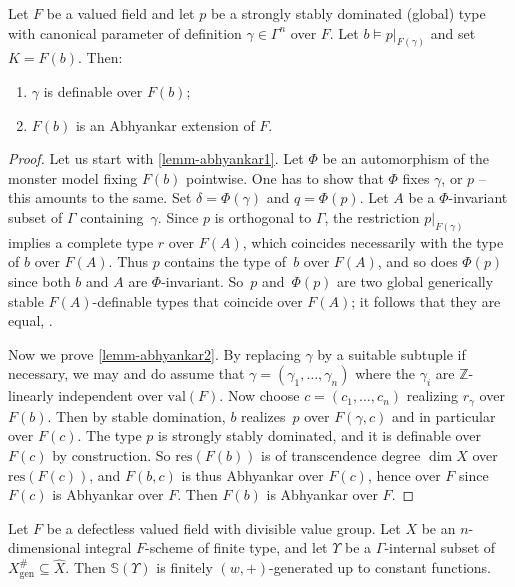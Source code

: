 \documentclass[JEP,XML,SOM,Unicode,ThmDefs,NoEqCountersInSection,published]{cedram}
\newcommand{\val}{\mathrm{val}}
\newcommand{\Z}{\mathbb Z}
\renewcommand{\SS}{\mathbb S}
\theoremstyle{plain}
\theoremstyle{definition}
\begin{document}
\begin{lemm}\label{lemm-abhyankar}
Let $F$ be a valued field and let $p$ be a strongly stably dominated (global) type with canonical parameter
of definition $\gamma\in \Gamma^n$ over $F$. Let $b\models p|_{F(\gamma)}$ and set $K=F(b)$. Then:
\begin{enumerate}
\item\label{lemm-abhyankar1} $\gamma$ is definable over $F(b)$;
\item\label{lemm-abhyankar2} $F(b)$ is an Abhyankar extension of $F$.
\end{enumerate}
\end{lemm}
\begin{proof}
Let us start with \eqref{lemm-abhyankar1}. Let $\Phi$ be an automorphism of the monster model fixing $F(b)$ pointwise. One has to show that $\Phi$ fixes $\gamma$, or $p$ --
this amounts to the same. Set $\delta=\Phi(\gamma)$ and $q=\Phi(p)$. Let $A$ be a $\Phi$-invariant subset of $\Gamma$ containing~$\gamma$.
Since $p$ is orthogonal to $\Gamma$,
the restriction $p|_{F(\gamma)}$ implies a complete type $r$ over $F(A)$, which coincides necessarily with the type of $b$ over $F(A)$. Thus $p$ contains the type of~$b$ over $F(A)$, and so does $\Phi(p)$ since both $b$ and $A$ are $\Phi$-invariant. So~$p$ and~$\Phi(p)$ are two global generically stable $F(A)$-definable types that coincide over $F(A)$; it follows that they are equal, \cf \cite[Prop.\,2.35]{simon}.

Now we prove \eqref{lemm-abhyankar2}. By replacing $\gamma$ by a suitable subtuple if necessary, we may and do assume that
$\gamma=(\gamma_1,\ldots, \gamma_n)$ where the $\gamma_i$ are $\Z$-linearly independent over $\val (F)$.
Now choose $c=(c_1,\ldots, c_n)$ realizing $r_\gamma$ over $F(b)$. Then by stable domination, $b$ realizes~$p$ over $F(\gamma, c)$
and in particular over $F(c)$. The type $p$ is strongly stably dominated, and it is definable over $F(c)$ by construction. So $\mathrm{res}(F(b))$
is of transcendence degree $\dim X$
over $\mathrm{res}(F(c))$, and $F(b,c)$ is thus Abhyankar over $F(c)$, hence over
$F$ since $F(c)$ is Abhyankar over $F$. Then $F(b)$ is Abhyankar over $F$.
\end{proof}

\begin{theo}\label{theo-tfinite-pure}Let $F$ be a defectless valued field with divisible value group. Let
$X$ be an $n$\nobreakdash-dimen\-sional integral $F$-scheme of finite type, and let $\Upsilon$ be a $\Gamma$-internal subset
of $X^{\#}_{\mathrm{gen}}\subseteq \widehat X$.
Then $\SS(\Upsilon)$
is finitely $(w,+)$-generated up to constant functions.
\end{theo}
\end{document}
